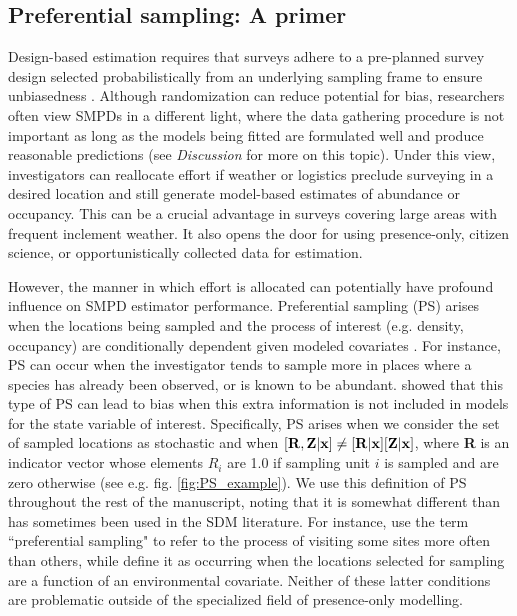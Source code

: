 \documentclass[times,mee,doublespace,]{besauth2}
\begin{document}
\subsection{Preferential sampling: A primer}

Design-based estimation requires that surveys adhere to a pre-planned survey design selected probabilistically from an underlying sampling frame to ensure unbiasedness \citep{Cochran1977}.  Although randomization can reduce potential for bias, researchers often view SMPDs in a different light, where the data gathering procedure is not important as long as the models being fitted are formulated well and produce reasonable predictions (see \textit{Discussion} for more on this topic).  Under this view, investigators can reallocate effort if weather or logistics preclude surveying in a desired location and still generate model-based estimates of abundance or occupancy.  This can be a crucial advantage in surveys covering large areas with frequent inclement weather.  It also opens the door for using presence-only, citizen science, or opportunistically collected data for estimation.

However, the manner in which effort is allocated can potentially have profound influence on SMPD estimator performance.   Preferential sampling (PS) arises when the locations being sampled and the process of interest (e.g. density, occupancy) are conditionally dependent given modeled covariates \citep{DiggleEtAl2010}.  For instance, PS can occur when the investigator tends to sample more in places where a species has already been observed, or is known to be abundant. \citet{DiggleEtAl2010} showed that this type of PS can lead to bias when this extra information is not included in models for the state variable of interest.  Specifically, PS arises when we consider the set of sampled locations as stochastic and when $[{\bf R},{\bf Z} | {\bf x}] \neq [{\bf R}|{\bf x}][{\bf Z}|{\bf x}]$, where \textbf{R} is an indicator vector whose elements $R_i$ are 1.0 if sampling unit $i$ is sampled and are zero otherwise (see e.g. fig. \ref{fig:PS_example}).  We use this definition of PS throughout the rest of the manuscript, noting that it is somewhat different than has sometimes been used in the SDM literature.  For instance, \citet{MerckxEtAl2011} use the term ``preferential sampling" to refer to the process of visiting some sites more often than others, while \citet{ManceurKuhn2014} define it as occurring when the locations selected for sampling are a function of an environmental covariate.  Neither of these latter conditions are problematic outside of the specialized field of presence-only modelling.
\end{document}

